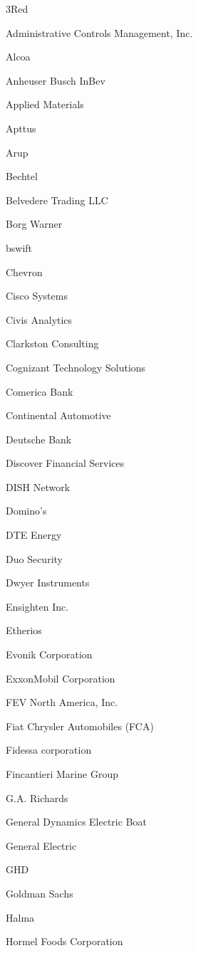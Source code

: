 \documentclass[twoside]{article}
\begin{document}
\begin{center}
\begin{multicols}{5}
        \begin{FlushLeft}
        \begin{compactitem}
        \item 3Red
\item Administrative Controls Management, Inc.
\item Alcoa
\item Anheuser Busch InBev
\item Applied Materials
\item Apttus
\item Arup
\item Bechtel
\item Belvedere Trading LLC
\item Borg Warner
\item bswift
\item Chevron
\item Cisco Systems
\item Civis Analytics
\item Clarkston Consulting
\item Cognizant Technology Solutions
\item Comerica Bank
\item Continental Automotive
\item Deutsche Bank
\item Discover Financial Services
\item DISH Network
\item Domino's
\item DTE Energy
\item Duo Security
\item Dwyer Instruments
\item Ensighten Inc.
\item Etherios
\item Evonik Corporation
\item ExxonMobil Corporation
\item FEV North America, Inc.
\item Fiat Chrysler Automobiles (FCA)
\item Fidessa corporation
\item Fincantieri Marine Group
\item G.A. Richards
\item General Dynamics Electric Boat
\item General Electric
\item GHD
\item Goldman Sachs
\item Halma
\item Hormel Foods Corporation

\end{compactitem}
\end{FlushLeft}
\end{multicols}
\end{center}
\end{document}
